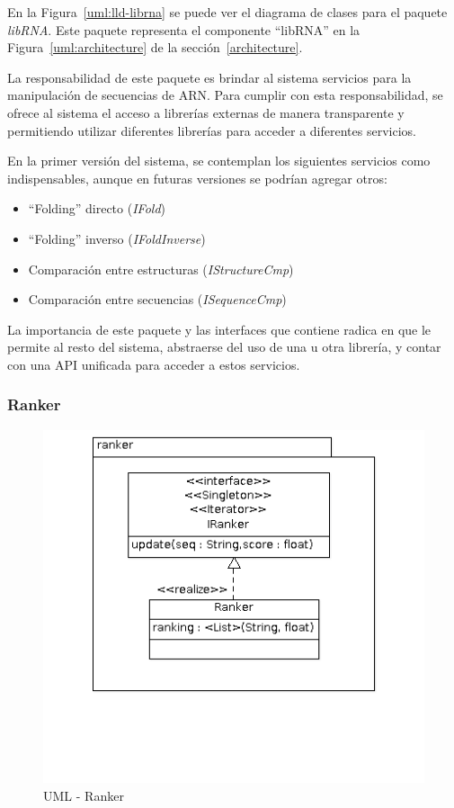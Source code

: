   En la Figura~\ref{uml:lld-librna} se puede ver el diagrama de clases
para el paquete \textit{libRNA}. Este paquete representa el componente
``libRNA'' en la Figura~\ref{uml:architecture} de la
secci\'on~\ref{architecture}.

  La responsabilidad de este paquete es brindar al sistema servicios para la
manipulaci\'on de secuencias de ARN. Para cumplir con esta responsabilidad, se
ofrece al sistema el acceso a librer\'ias externas de manera transparente y
permitiendo utilizar diferentes librer\'ias para acceder a diferentes servicios.

  En la primer versi\'on del sistema, se contemplan los siguientes servicios
como indispensables, aunque en futuras versiones se podr\'ian agregar otros:

  \begin{itemize}
   \item ``Folding'' directo (\textit{IFold})
   \item ``Folding'' inverso (\textit{IFoldInverse})
   \item Comparaci\'on entre estructuras (\textit{IStructureCmp})
   \item Comparaci\'on entre secuencias (\textit{ISequenceCmp})
  \end{itemize}

  La importancia de este paquete y las interfaces que contiene radica en que le
permite al resto del sistema, abstraerse del uso de una u otra librer\'ia, y
contar con una API unificada para acceder a estos servicios.    

  \subsubsection{Ranker}
  \begin{figure}
      \centering
      \includegraphics[scale=0.5]{lld-ranker.png}  
      \caption{UML - Ranker}
      \label{uml:lld-ranker}
    \end{figure}

